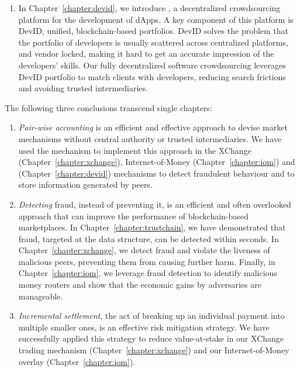 \begin{enumerate}
	\item In Chapter~\ref{chapter:devid}, we introduce \Dappcoder{}, a decentralized crowdsourcing platform for the development of dApps.
	A key component of this platform is DevID, unified, blockchain-based portfolios.
	DevID solves the problem that the portfolio of developers is usually scattered across centralized platforms, and vendor locked, making it hard to get an accurate impression of the developers' skills.
	Our fully decentralized software crowdsourcing leverages DevID portfolio to match clients with developers, reducing search frictions and avoiding trusted intermediaries.
\end{enumerate}

\noindent The following three conclusions transcend single chapters:

\begin{enumerate}[resume]	
	\item \emph{Pair-wise accounting} is an efficient and effective approach to devise market mechanisms without central authority or trusted intermediaries.
	We have used the \TrustChain{} mechanism to implement this approach in the XChange (Chapter~\ref{chapter:xchange}), Internet-of-Money (Chapter~\ref{chapter:iom}) and \Dappcoder{} (Chapter~\ref{chapter:devid}) mechanisms to detect fraudulent behaviour and to store information generated by peers.
	
	\item \emph{Detecting} fraud, instead of preventing it, is an efficient and often overlooked approach that can improve the performance of blockchain-based marketplaces.
	In Chapter~\ref{chapter:trustchain}, we have demonstrated that fraud, targeted at the \TrustChain{} data structure, can be detected within seconds.
	In Chapter~\ref{chapter:xchange}, we detect fraud and violate the liveness of malicious peers, preventing them from causing further harm.
	Finally, in Chapter~\ref{chapter:iom}, we leverage fraud detection to identify malicious money routers and show that the economic gains by adversaries are manageable.
	
	\item \emph{Incremental settlement}, the act of breaking up an individual payment into multiple smaller ones, is an effective risk mitigation strategy.
	We have successfully applied this strategy to reduce value-at-stake in our XChange trading mechanism (Chapter~\ref{chapter:xchange}) and our Internet-of-Money overlay (Chapter~\ref{chapter:iom}).
	
\end{enumerate}

